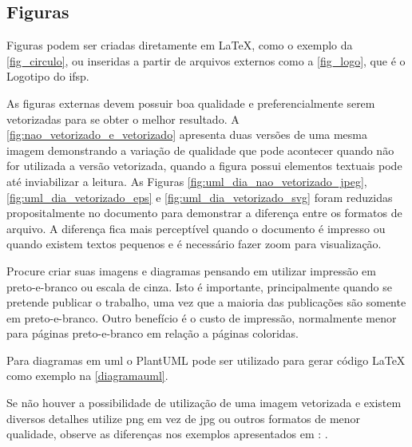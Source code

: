 \subsection{Figuras}
\label{sec_figuras}

Figuras podem ser criadas diretamente em \LaTeX,
como o exemplo da \autoref{fig_circulo}, ou inseridas a partir de arquivos externos como a \autoref{fig_logo}, que é o Logotipo do \ac{ifsp}. 

As figuras externas devem possuir boa qualidade e preferencialmente serem vetorizadas para se obter o melhor resultado. A \autoref{fig:nao_vetorizado_e_vetorizado} apresenta duas versões de uma mesma imagem demonstrando a variação de qualidade que pode acontecer quando não for utilizada a versão vetorizada, quando a figura possui elementos textuais pode até inviabilizar a leitura. As Figuras \ref{fig:uml_dia_nao_vetorizado_jpeg}, \ref{fig:uml_dia_vetorizado_eps} e \ref{fig:uml_dia_vetorizado_svg} foram reduzidas propositalmente no documento para demonstrar a diferença entre os formatos de arquivo. A diferença fica mais perceptível quando o documento é impresso ou quando existem textos pequenos e é necessário fazer zoom para visualização.

Procure criar suas imagens e diagramas pensando em utilizar impressão em preto-e-branco ou escala de cinza. Isto é importante, principalmente quando se pretende publicar o trabalho, uma vez que a maioria das publicações são somente em preto-e-branco. Outro benefício é o custo de impressão, normalmente menor para páginas preto-e-branco em relação a páginas coloridas.

Para diagramas em \ac{uml} o PlantUML pode ser utilizado para gerar código {\LaTeX} como exemplo na  \autoref{diagramauml}.


Se não houver a possibilidade de utilização de uma imagem vetorizada e existem diversos detalhes utilize \ac{png} em vez de \gls{jpg} ou outros formatos de menor qualidade, observe as diferenças nos exemplos apresentados em :  .


